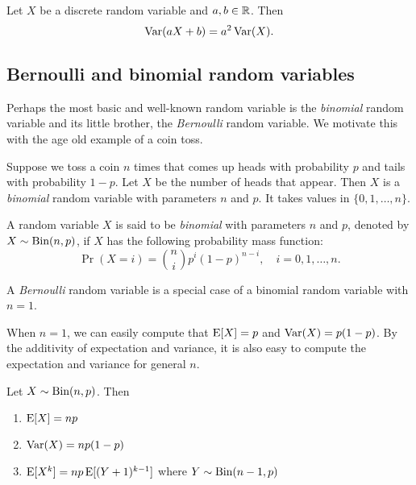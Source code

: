 \documentclass{article}
\begin{document}
\begin{proposition}
  Let $X$ be a discrete random variable and $a, b \in \mathbb{R}$.
  Then
  \[
    \operatorname{Var}(a X + b) = a^2 \operatorname{Var}(X).
  \]
\end{proposition}

\subsection{Bernoulli and binomial random variables}

Perhaps the most basic and well-known random variable is the \emph{binomial} random variable and its little brother, the \emph{Bernoulli} random variable.
We motivate this with the age old example of a coin toss.

\begin{example}
  Suppose we toss a coin $n$ times that comes up heads with probability $p$ and tails with probability $1 - p$.
  Let $X$ be the number of heads that appear.
  Then $X$ is a \emph{binomial} random variable with parameters $n$ and $p$.
  It takes values in $\{0, 1, \ldots, n\}$.
\end{example}

\begin{definition}
  A random variable $X$ is said to be \emph{binomial} with parameters $n$ and $p$, denoted by $X \sim \textnormal{Bin}(n, p)$, if $X$ has the following probability mass function:
  \[
    \Pr(X = i) = \binom{n}{i} p^i (1 - p)^{n - i}, \quad i = 0, 1, \ldots, n.
  \]
\end{definition}

\begin{remark}
  A \emph{Bernoulli} random variable is a special case of a binomial random variable with $n = 1$.
\end{remark}

When $n = 1$, we can easily compute that $\operatorname{E}[X] = p$ and $\operatorname{Var}(X) = p(1 - p)$.
By the additivity of expectation and variance, it is also easy to compute the expectation and variance for general $n$.
\begin{theorem}
  Let $X \sim \textnormal{Bin}(n, p)$.
  Then
  \begin{enumerate}
    \item $\operatorname{E}[X] = np$
    \item $\operatorname{Var}(X) = np(1 - p)$
    \item $\operatorname{E}[X^k] = np \operatorname{E}[(Y + 1)^{k - 1}]$ where $Y \sim \textnormal{Bin}(n - 1, p)$
  \end{enumerate}
\end{theorem}
\end{document}
